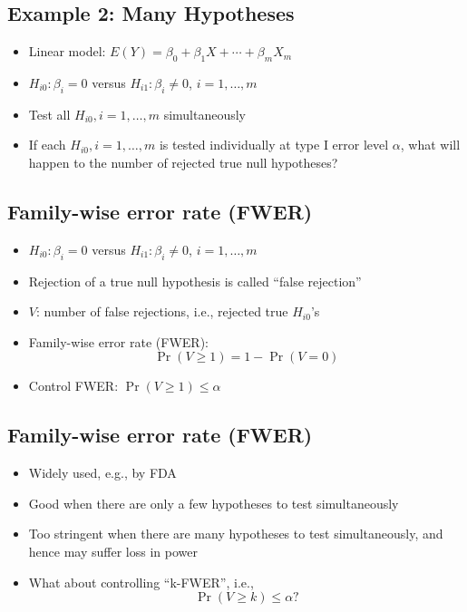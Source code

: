 \documentclass[]{article}
\begin{document}
\subsection{Example 2: Many Hypotheses}\label{example-2-many-hypotheses}

\begin{itemize}
\item
  Linear model:
  \(E(Y) = \beta_0 + \beta_1 X + \cdots + \beta_{m} X_{m}\)
\item
  \(H_{i0}: \beta_i =0\) versus \(H_{i1}:\beta_i \ne 0\),
  \(i=1,\ldots,m\)
\item
  Test all \(H_{i0},i=1,\ldots,m\) simultaneously
\item
  If each \(H_{i0}, i=1,\ldots,m\) is tested individually at type I
  error level \(\alpha\), what will happen to the number of rejected
  true null hypotheses?
\end{itemize}

\subsection{Family-wise error rate
(FWER)}\label{family-wise-error-rate-fwer}

\begin{itemize}
\item
  \(H_{i0}: \beta_i =0\) versus \(H_{i1}:\beta_i \ne 0\),
  \(i=1,\ldots,m\)
\item
  Rejection of a true null hypothesis is called ``false rejection''
\item
  \(V\): number of false rejections, i.e., rejected true \(H_{i0}\)'s
\item
  Family-wise error rate (FWER): \[\Pr(V \ge 1) = 1 - \Pr(V=0)\]
\item
  Control FWER: \(\Pr(V \ge 1) \le \alpha\)
\end{itemize}

\subsection{Family-wise error rate
(FWER)}\label{family-wise-error-rate-fwer-1}

\begin{itemize}
\item
  Widely used, e.g., by FDA
\item
  Good when there are only a few hypotheses to test simultaneously
\item
  Too stringent when there are many hypotheses to test simultaneously,
  and hence may suffer loss in power
\item
  What about controlling ``k-FWER'', i.e., \[\Pr(V \ge k) \le \alpha ?\]
\end{itemize}
\end{document}
